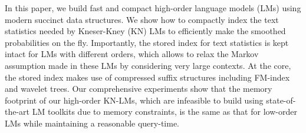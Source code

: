 In this paper, we build  fast and compact high-order \ngram language models (LMs) using modern succinct data structures.
%
We show how to compactly index the text statistics needed by Kneser-Kney (KN) LMs 
to efficiently make the smoothed probabilities on the fly.
%
Importantly, the stored index for text statistics is kept intact for \ngram LMs with different orders, 
which allows to relax the Markov assumption made in these LMs by considering very large contexts.
%
At the core, the stored index makes use of compressed suffix structures including FM-index and wavelet trees.
%
Our comprehensive experiments show that the memory footprint of our high-order KN-LMs, which are infeasible to build using 
state-of-the-art LM toolkits due to memory constraints, is the same as that for low-order LMs while maintaining 
a reasonable query-time. 
